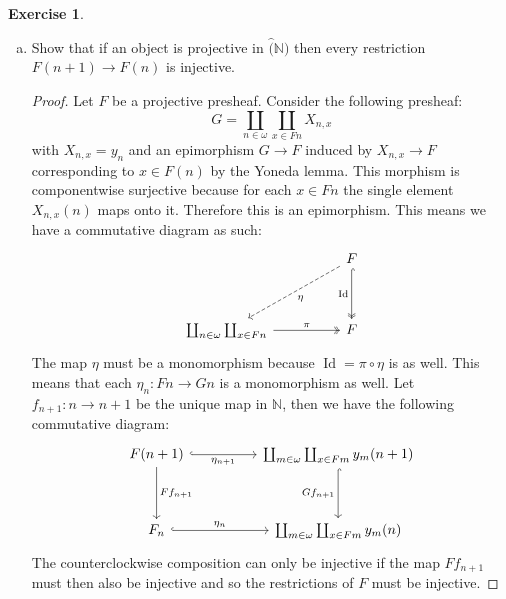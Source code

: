 \documentclass{article}
\newcommand{\N}{\mathbb{N}}
\DeclareMathOperator{\Id}{Id}
\newcommand{\psh}[1]{\widehat{#1}}
\theoremstyle{definition}
\newtheorem{question}{Exercise}
\begin{document}
\begin{question}
\begin{enumerate}[a)]
\begin{proof}
                  Therefore the terminal object \(1\) cannot be projective.
              \end{proof}

        \item Show that if an object is projective in \(\psh(\N)\) then every
              restriction \(F(n+1)\to F(n)\) is injective.

              \begin{proof}
                  Let \(F\) be a projective presheaf. Consider the following
                  presheaf:
                  \[
                      G=\coprod_{n\in\omega}\coprod_{x\in Fn}X_{n,x}
                  \]
                  with \(X_{n,x}=y_{n}\) and an epimorphism \(G\to F\) induced
                  by \(X_{n,x}\to F\) corresponding to \(x\in F(n)\) by the
                  Yoneda lemma. This morphism is componentwise surjective
                  because for each \(x\in Fn\) the single element \(X_{n,x}(n)\)
                  maps onto it. Therefore this is an epimorphism. This means we
                  have a commutative diagram as such:
                  \[
                      \begin{tikzcd}[ampersand replacement=\&]
                          \&\& F \\
                          \\
                          {\coprod_{n\in\omega}\coprod_{x\in Fn}} \&\& F
                          \arrow["\eta", dashed, from=1-3, to=3-1]
                          \arrow["\pi", two heads, from=3-1, to=3-3]
                          \arrow["\Id"', hook, two heads, from=1-3, to=3-3]
                      \end{tikzcd}
                  \]
                  The map \(\eta\) must be a monomorphism because
                  \(\Id=\pi\circ\eta\) is as well. This means that each
                  \(\eta_{n}:Fn\to Gn\) is a monomorphism as well. Let
                  \(f_{n+1}:n\to n+1\) be the unique map in \(\N\), then we have
                  the following commutative diagram:
                  \[
                      \begin{tikzcd}[ampersand replacement=\&]
                          {F(n+1)} \&\& {\coprod_{m\in\omega}\coprod_{x\in Fm}y_{m}(n+1)} \\
                          \\
                          {F_{n}} \&\& {\coprod_{m\in\omega}\coprod_{x\in Fm}y_{m}(n)}
                          \arrow["{\eta_{n+1}}"', hook, from=1-1, to=1-3]
                          \arrow["{Gf_{n+1}}"', hook, from=1-3, to=3-3]
                          \arrow["{Ff_{n+1}}", from=1-1, to=3-1]
                          \arrow["{\eta_{n}}", hook, from=3-1, to=3-3]
                      \end{tikzcd}
                  \]
                  The counterclockwise composition can only be injective if the
                  map \(Ff_{n+1}\) must then also be injective and so the
                  restrictions of \(F\) must be injective.
              \end{proof}


\end{enumerate}
\end{question}
\end{document}
